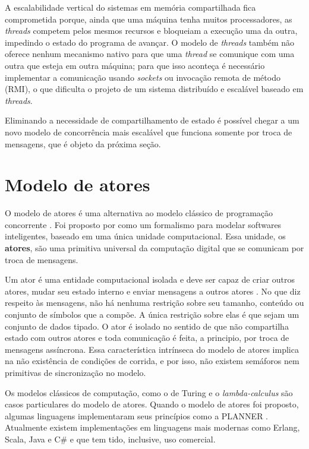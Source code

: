 A escalabilidade vertical do sistemas em memória compartilhada fica comprometida porque, ainda que uma máquina tenha muitos processadores, as \textit{threads} competem  pelos mesmos recursos e bloqueiam a execução uma da outra, impedindo o estado do programa de avançar. O modelo de \textit{threads} também não oferece nenhum mecanismo nativo para que uma \textit{thread} se comunique com uma outra que esteja em outra máquina; para que isso aconteça é necessário implementar a comunicação usando \textit{sockets} ou invocação remota de método (RMI), o que dificulta o projeto de um sistema distribuído e escalável baseado em \textit{threads}. 

Eliminando a necessidade de compartilhamento de estado é possível chegar a um novo modelo de concorrência mais escalável que funciona somente por troca de mensagens, que é objeto da próxima seção.

\section{Modelo de atores}
\label{sec:atores}

O modelo de atores é uma alternativa ao modelo clássico de programação concorrente \cite{Agha1985}. Foi proposto por  como um formalismo para modelar softwares inteligentes, baseado em uma única unidade computacional. Essa unidade, os \textbf{atores}, são uma primitiva universal da computação digital que se comunicam por troca de mensagens. 

Um ator é uma entidade computacional isolada e deve ser capaz de criar outros atores, mudar seu estado interno e enviar mensagens a outros atores \cite{Hewitt2010}. No que diz respeito às mensagens, não há nenhuma restrição sobre seu tamanho, conteúdo ou conjunto de símbolos que a compõe. A única restrição sobre elas é que sejam um conjunto de dados tipado. O ator é isolado no sentido de que não compartilha estado com outros atores e toda comunicação é feita, a principio, por troca de mensagens assíncrona. Essa característica intrínseca do modelo de atores implica na não existência de condições de corrida, e por isso, não existem semáforos nem primitivas de sincronização no modelo.

Os modelos clássicos de computação, como o de Turing e o \textit{lambda-calculus} são casos particulares do modelo de atores\cite{Hewitt2013}. Quando o modelo de atores foi proposto, algumas linguagens implementaram seus princípios como a PLANNER \cite{Hewitt1973}. Atualmente existem implementações em linguagens mais modernas como Erlang, Scala, Java e C\# e que tem tido, inclusive, uso comercial.

